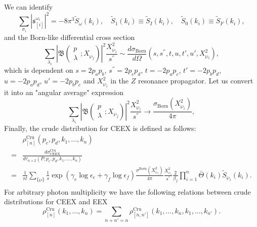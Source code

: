 We can identify
\begin{equation*}
\sum_{\sigma_i}\left|\mathfrak{s}^{\omega_i}_{[i]}\right|^2=-8\pi^3\widetilde{S}_\omega(k_i),\quad \widetilde{S}_1(k_i)\equiv \widetilde{S}_I(k_i),\quad \widetilde{S}_0(k_i)\equiv \widetilde{S}_F(k_i),
\end{equation*}
and the Born-like differential cross section
\begin{equation*}
\sum_{\lambda_i}\left|\mathfrak{B}\left(\begin{array}{c}
p\\\lambda
\end{array};X_{\wp_j} \right)\right|^2\frac{X^2_{\wp_i}}{s^{''}}\sim\frac{d\sigma_\text{Born}}{d\Omega}(s,s^{''},t,u,t',u',X^2_{\wp_i}),
\end{equation*}
which is dependent on $s=2p_ap_b$, $s^{''}=2p_cp_d$, $t=-2p_ap_c$, $t'=-2p_bp_d$, $u=-2p_ap_d$, $u'=-2p_bp_c$ and $X^2_{\wp_i}$ in the $Z$ resonance propagator. Let us convert it into an "angular average" expression
\begin{equation*}
\sum_{\lambda_i}\left|\mathfrak{B}\left(\begin{array}{c}
p\\\lambda
\end{array};X_{\wp_j} \right)\right|^2\frac{X^2_{\wp_i}}{s^{''}}\to\frac{\sigma_\text{Born}(X^2_{\wp_i})}{4\pi},
\end{equation*}
Finally, the crude distribution for CEEX is defined as follows:
\begin{align}
&\rho^\text{Cru}_{[n]}(p_c,p_d,k_1,\ldots,k_n)\nonumber\\
=&\frac{d\sigma^\text{Cru}_\text{CEEX}}{d\tau_{n+2}(P;p_c,p_d,k_1,\ldots,k_n)}\nonumber\\
=&\frac{1}{n!}\sum_{\{\wp\}}\frac{1}{s}\exp(\gamma_e\log\epsilon_e+\gamma_f\log\epsilon_f)\frac{\sigma^\text{Born}(X^2_{\wp_i})}{4\pi}\frac{X^2_{\wp_i}}{s^{''}}\frac{2}{\beta_f}\prod_{i=1}^{n}\bar{\Theta}(k_i)\widetilde{S}_{\wp_i}(k_i).\nonumber\\
\end{align}
For arbitrary photon multiplicity we have the following relations between crude distributions for CEEX and EEX
\begin{equation}
\rho^\text{Cru}_{[n]}(k_1,\ldots,k_n)=\sum_{\dot{n}+n'=n}\rho^\text{Cru}_{[\dot{n},n']}(k_1,\ldots,k_{\dot{n}},k_1,\ldots,k_{n'}).
\end{equation}




